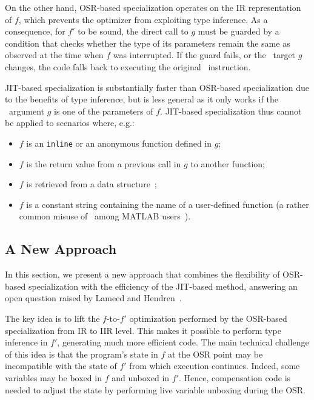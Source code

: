 On the other hand, OSR-based specialization operates on the IR representation of $f$, which prevents the optimizer from exploiting type inference. As a consequence, for $f'$ to be sound, the direct call to $g$ must be guarded by a condition that checks whether the type of its parameters remain the same as observed at the time when $f$ was interrupted. If the guard fails, or the \feval\ target $g$ changes, the code falls back to executing the original \feval\ instruction.

JIT-based specialization is substantially faster than OSR-based specialization due to the benefits of type inference, but is less general as it only works if the \feval\ argument $g$ is one of the parameters of $f$. JIT-based specialization thus cannot be applied to scenarios where, e.g.:
\begin{itemize}[itemsep=0pt,parsep=3pt,partopsep=0pt]
\item $f$ is an {\tt inline} or an anonymous function defined in $g$;
\item $f$ is the return value from a previous call in $g$ to another function;
\item $f$ is retrieved from a data structure~\cite{Lameed2013b};
\item $f$ is a constant string containing the name of a user-defined function (a rather common misuse of \feval\ among MATLAB users~\cite{Radpour2013}).
\end{itemize}

\subsection{A New Approach}
\label{ss:CS-new-eval-sol}

In this section, we present a new approach that combines the flexibility of OSR-based specialization with the efficiency of the JIT-based method, answering an open question raised by Lameed and Hendren~\cite{Lameed2013b}.

The key idea is to lift the $f$-to-$f'$ optimization performed by the OSR-based specialization from IR to IIR level. This makes it possible to perform type inference in $f'$, generating much more efficient code. The main technical challenge of this idea is that the program's state in $f$ at the OSR point may be incompatible with the state of $f'$ from which execution continues. Indeed, some variables may be boxed in $f$ and unboxed in $f'$. Hence, compensation code is needed to adjust the state by performing live variable unboxing during the OSR.

